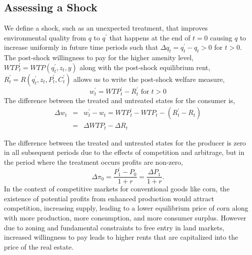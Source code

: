\documentclass[ecta,nameyear,draft]{econsocart}
\theoremstyle{plain}
\theoremstyle{remark}
\begin{document}
\subsection{Assessing a Shock}
We define a shock, such as an unexpected treatment, that improves environmental quality from $q$ to $q^\prime$ that happens at the end of $t=0$ causing $q$ to increase uniformly in future time periods such that $\Delta q_t=q^\prime_t-q_t>0$ for $t>0$.
The post-shock willingness to pay for the higher amenity level,$\mathit{WTP}^\prime_t=\mathit{WTP}(q^\prime_t,z_t,y)$ along with the post-shock equilibrium rent, $R^\prime_t=R(q^\prime_t,z_t,P^\prime_t,C^\prime_t)$ allows us to write the post-shock welfare measure,
\begin{equation*}
	w^\prime_t=\mathit{WTP}^\prime_t-R^\prime_t \text{ for } t>0
\end{equation*}
The difference between the treated and untreated states for the consumer is,
\begin{eqnarray*}
	\Delta w_t&=&w^\prime_t-w_t=\mathit{WTP}^\prime_t-\mathit{WTP}_t-(R^\prime_t-R_t)\\
	&=&\Delta\mathit{WTP}_t-\Delta R_t
\end{eqnarray*}

The difference between the treated and untreated states for the producer is zero in all subsequent periods due to the effects of competition and arbitrage, but in the period where the treatment occurs profits are non-zero,
\begin{equation}
	\Delta\pi_0=\frac{P^\prime_1-P_0}{1+r}=\frac{\Delta P_1}{1+r}.\label{pitzero}
\end{equation}
In the context of competitive markets for conventional goods like corn, the existence of potential profits from enhanced production would attract competition, increasing supply, leading to a lower equilibrium price of corn along with more production, more consumption, and more consumer surplus. However due to zoning and fundamental constraints to free entry in land markets, increased willingness to pay leads to higher rents that are capitalized into the price of the real estate. 
\end{document}
